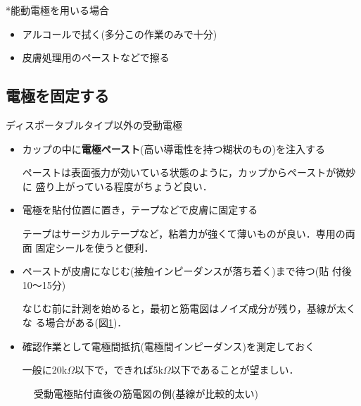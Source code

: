 \documentclass[10pt,twocolumn]{jarticle}
\begin{document}
*能動電極を用いる場合
\begin{itemize}
\item アルコールで拭く(多分この作業のみで十分)
\item 皮膚処理用のペーストなどで擦る
\end{itemize}

\subsection{電極を固定する}
ディスポータブルタイプ以外の受動電極
\begin{itemize}
\item カップの中に{\bf 電極ペースト}(高い導電性を持つ糊状のもの)を注入する

ペーストは表面張力が効いている状態のように，カップからペーストが微妙に
盛り上がっている程度がちょうど良い．
\item 電極を貼付位置に置き，テープなどで皮膚に固定する

テープはサージカルテープなど，粘着力が強くて薄いものが良い．専用の両面
固定シールを使うと便利．
\item ペーストが皮膚になじむ(接触インピーダンスが落ち着く)まで待つ(貼
  付後10〜15分)

なじむ前に計測を始めると，最初と筋電図はノイズ成分が残り，基線が太くな
る場合がある(図\ref{fig:2-12})．

\item 確認作業として電極間抵抗(電極間インピーダンス)を測定しておく

一般に20k$\Omega$以下で，できれば5k$\Omega$以下であることが望ましい．
\end{itemize}
\begin{figure}[h]
  \centering
  \caption{受動電極貼付直後の筋電図の例(基線が比較的太い)\label{fig:2-12}}
 \end{figure}
\end{document}
